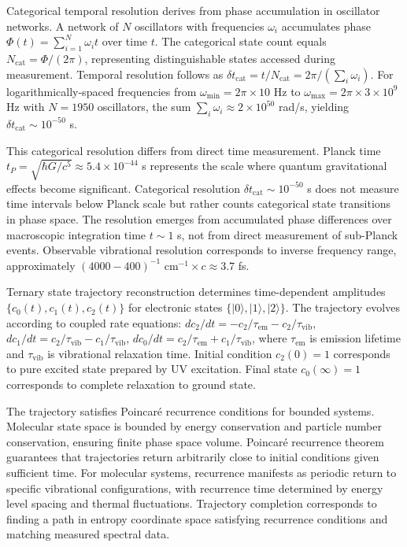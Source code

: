 \documentclass[twocolumn,10pt]{article}
\begin{document}
Categorical temporal resolution derives from phase accumulation in oscillator networks. A network of $N$ oscillators with frequencies $\omega_i$ accumulates phase $\Phi(t) = \sum_{i=1}^N \omega_i t$ over time $t$. The categorical state count equals $N_{\text{cat}} = \Phi/(2\pi)$, representing distinguishable states accessed during measurement. Temporal resolution follows as $\delta t_{\text{cat}} = t/N_{\text{cat}} = 2\pi/(\sum_i \omega_i)$. For logarithmically-spaced frequencies from $\omega_{\min} = 2\pi \times 10$ Hz to $\omega_{\max} = 2\pi \times 3 \times 10^9$ Hz with $N=1950$ oscillators, the sum $\sum_i \omega_i \approx 2 \times 10^{50}$ rad/s, yielding $\delta t_{\text{cat}} \sim 10^{-50}$ s.

This categorical resolution differs from direct time measurement. Planck time $t_P = \sqrt{\hbar G/c^5} \approx 5.4 \times 10^{-44}$ s represents the scale where quantum gravitational effects become significant. Categorical resolution $\delta t_{\text{cat}} \sim 10^{-50}$ s does not measure time intervals below Planck scale but rather counts categorical state transitions in phase space. The resolution emerges from accumulated phase differences over macroscopic integration time $t \sim 1$ s, not from direct measurement of sub-Planck events. Observable vibrational resolution corresponds to inverse frequency range, approximately $(4000 - 400)^{-1}$ cm$^{-1} \times c \approx 3.7$ fs.

Ternary state trajectory reconstruction determines time-dependent amplitudes $\{c_0(t), c_1(t), c_2(t)\}$ for electronic states $\{|0\rangle, |1\rangle, |2\rangle\}$. The trajectory evolves according to coupled rate equations: $dc_2/dt = -c_2/\tau_{\text{em}} - c_2/\tau_{\text{vib}}$, $dc_1/dt = c_2/\tau_{\text{vib}} - c_1/\tau_{\text{vib}}$, $dc_0/dt = c_2/\tau_{\text{em}} + c_1/\tau_{\text{vib}}$, where $\tau_{\text{em}}$ is emission lifetime and $\tau_{\text{vib}}$ is vibrational relaxation time. Initial condition $c_2(0) = 1$ corresponds to pure excited state prepared by UV excitation. Final state $c_0(\infty) = 1$ corresponds to complete relaxation to ground state.

The trajectory satisfies Poincar\'e recurrence conditions for bounded systems. Molecular state space is bounded by energy conservation and particle number conservation, ensuring finite phase space volume. Poincar\'e recurrence theorem guarantees that trajectories return arbitrarily close to initial conditions given sufficient time. For molecular systems, recurrence manifests as periodic return to specific vibrational configurations, with recurrence time determined by energy level spacing and thermal fluctuations. Trajectory completion corresponds to finding a path in entropy coordinate space satisfying recurrence conditions and matching measured spectral data.
\end{document}
